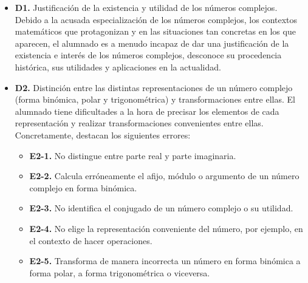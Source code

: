 \documentclass[../main.tex]{memoir}
\begin{document}
\begin{itemize}
	\item \textbf{D1.} Justificación de la existencia y utilidad de los números complejos. \\
		Debido a la acusada especialización de los números complejos, los contextos matemáticos que protagonizan y en las situaciones tan concretas en los que aparecen, el alumnado es a menudo incapaz de dar una justificación de la existencia e interés de los números complejos, desconoce su procedencia histórica, sus utilidades y aplicaciones en la actualidad.
		
	\item \textbf{D2.} Distinción entre las distintas representaciones de un número complejo (forma binómica, polar y trigonométrica) y transformaciones entre ellas.
	El alumnado tiene dificultades a la hora de precisar los elementos de cada representación y realizar transformaciones convenientes entre ellas. Concretamente, destacan los siguientes errores:
	\begin{itemize}
		\item \textbf{E2-1.} No distingue entre parte real y parte imaginaria.
		\item \textbf{E2-2.} Calcula erróneamente el afijo, módulo o argumento de un número complejo en forma binómica.
		\item \textbf{E2-3.} No identifica el conjugado de un número complejo o su utilidad.
		\item \textbf{E2-4.} No elige la representación conveniente del número, por ejemplo, en el contexto de hacer operaciones.
		\item \textbf{E2-5.} Transforma de manera incorrecta un número en forma binómica a forma polar, a  forma trigonométrica o viceversa.
	\end{itemize}
	

\end{itemize}
\end{document}
